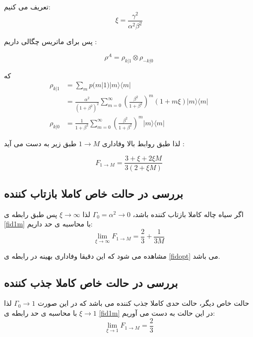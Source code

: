 تعریف می کنیم:
\begin{equation}
	\xi = \frac{\gamma^2}{\alpha^2 \beta^2}
\end{equation}

پس برای ماتریس چگالی داریم
\cite{cloner}:

\begin{equation}
	\rho^A = \rho_{k|1} \otimes \rho_{-k|0}
\end{equation}


که
\begin{align}
	\rho_{k|1} &= \sum_m p(m|1) |m\rangle \langle m| \\
	& = \frac{\alpha^2}{(1+\beta^2)^2} \sum_{m=0}^{\infty} (\frac{\beta^2}{1+\beta^2})^m (1+m\xi) |m\rangle \langle m| \\
	\rho_{k|0} &= \frac{1}{1+\beta^2} \sum_{m=0}^{\infty} (\frac{\beta^2}{1+\beta^2})^m |m\rangle \langle m|
\end{align}

لذا طبق روابط بالا وفاداری
$1 \to M$
طبق زیر به دست می آید
\cite{cloner}:

\begin{equation} \label{fid1m}
	F_{1 \to M} = \frac{3+\xi + 2\xi M}{3(2+\xi M)}
\end{equation}


\subsection{بررسی در حالت خاص کاملا بازتاب کننده}

اگر سیاه چاله کاملا بازتاب کننده باشد، 
$\Gamma_0 = \alpha^2 \to 0$
لذا 
$\xi \to \infty$
پس طبق رابطه ی 
\ref{fid1m}
با محاسبه ی حد داریم:
\begin{equation}
	\lim_{\xi \to \infty} F_{1 \to M} = \frac{2}{3} + \frac{1}{3M}
\end{equation}

مشاهده می شود که این دقیقا وفاداری بهینه در رابطه ی 
\ref{fidopt}
می باشد.

\subsection{بررسی در حالت خاص کاملا جذب کننده}

حالت خاص دیگر، حالت حدی کاملا جذب کننده می باشد که در این صورت
$\Gamma_0 \to 1$
لذا
$\xi \to 1$
با محاسبه ی حد رابطه ی 
\ref{fid1m}
در این حالت به دست می آوریم:
\begin{equation}
	\lim_{\xi \to 1} F_{1 \to M} = \frac{2}{3}
\end{equation}

